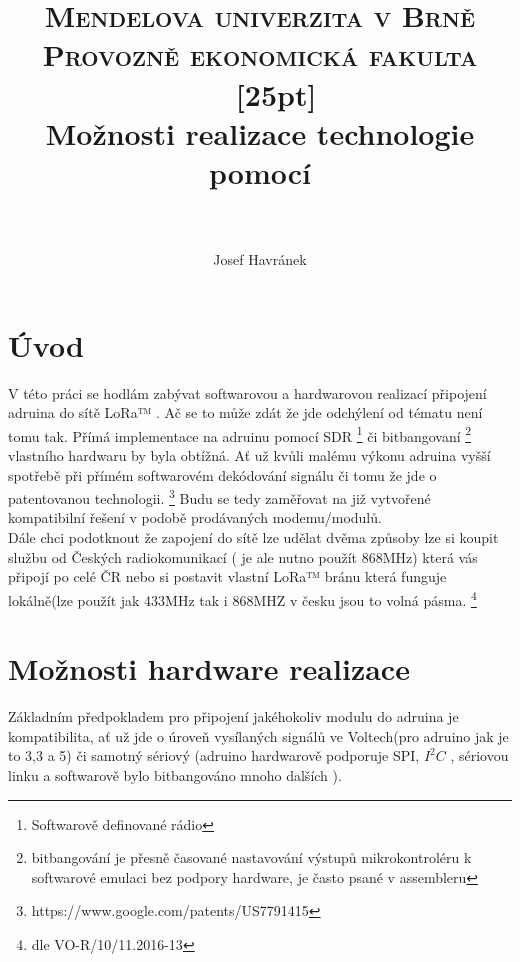 \documentclass[paper=a4, fontsize=11pt]{scrartcl}
\date{\displaydate{date}}
\title{	
	\normalfont \normalsize 
	\textsc{Mendelova univerzita v Brně\\Provozně ekonomická fakulta} \		\ [25pt] 
	\horrule{0.5pt} \\[0.4cm] 
	\huge Možnosti realizace technologie \lr \newline pomocí \Aro\\ 
	\horrule{2pt} \\[0.5cm] 
}
\author{Josef Havránek} %
\date{\displaydate{date}}
\numberwithin{equation}{section}
\numberwithin{figure}{section}
\numberwithin{table}{section}
\newcommand{\lr}{LoRa™ }
\newcommand{\ara}{adruina }
\newcommand{\aru}{adruinu }
\newcommand{\aro}{adruino }
\begin{document}
\maketitle 
\newpage
\section{Úvod}
	\setcounter{page}{1}
	V této práci se hodlám zabývat softwarovou a hardwarovou realizací
	připojení \ara do sítě \lr. Ač se to může zdát že jde odchýlení od
	tématu není tomu tak. Přímá  implementace na \aru pomocí SDR
	\footnote{Softwarově definované rádio} či bitbangovaní
	\footnote{bitbangování je přesně časované nastavování výstupů
	mikrokontroléru k softwarové emulaci  bez podpory hardware, je
	často psané v assembleru} vlastního hardwaru by byla obtížná. Ať už
	kvůli malému výkonu \ara vyšší spotřebě při přímém  softwarovém dekódování signálu či tomu že jde o patentovanou technologii.			\footnote{https://www.google.com/patents/US7791415} Budu se tedy
	zaměřovat na již vytvořené kompatibilní řešení v podobě prodávaných
	modemu/modulů. \\Dále chci podotknout že zapojení do sítě lze
	udělat dvěma způsoby lze si koupit službu od Českých
	radiokomunikací ( je ale nutno použít 868MHz)  která vás připojí po
	celé ČR nebo si postavit vlastní \lr bránu která funguje lokálně(lze použít jak 433MHz tak i 868MHZ v česku jsou to volná pásma.			\footnote{dle VO-R/10/11.2016-13}
\section{Možnosti hardware realizace}
	Základním předpokladem pro připojení jakéhokoliv modulu do \ara je kompatibilita, ať už jde o úroveň vysílaných signálů ve
	Voltech(pro \aro jak je to 3,3 a 5) či samotný sériový  (\aro hardwarově podporuje SPI, $I^2C$ , sériovou linku a
	softwarově bylo bitbangováno mnoho dalších ). 
\end{document}
